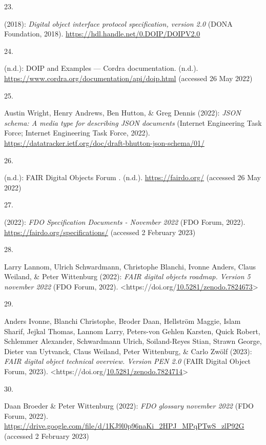 \begin{thebibliography}{9}
\hypertarget{ref-foundationDigitalObjectInterface}{}
23.

(2018): \emph{Digital object interface protocol specification, version
2.0} ({DONA Foundation}, 2018).
\url{https://hdl.handle.net/0.DOIP/DOIPV2.0}

\hypertarget{ref-DOIPExamplesCordraa}{}
24.

(n.d.): {DOIP} and {Examples} --- {Cordra} documentation. (n.d.).
\url{https://www.cordra.org/documentation/api/doip.html} (accessed 26
May 2022)

\hypertarget{ref-Draftbhuttonjsonschema}{}
25.

Austin Wright, Henry Andrews, Ben Hutton, \& Greg Dennis (2022):
\emph{JSON schema: A media type for describing JSON documents} (Internet
Engineering Task Force; Internet Engineering Task Force, 2022).
\url{https://datatracker.ietf.org/doc/draft-bhutton-json-schema/01/}

\hypertarget{ref-FAIRDigitalObjects}{}
26.

(n.d.): {FAIR Digital Objects Forum} \textbar. (n.d.).
\url{https://fairdo.org/} (accessed 26 May 2022)

\hypertarget{ref-fdo-Specs}{}
27.

(2022): \emph{{FDO Specification Documents - November 2022}} ({FDO
Forum}, 2022). \url{https://fairdo.org/specifications/} (accessed 2
February 2023)

\hypertarget{ref-fdo-Roadmap}{}
28.

Larry Lannom, Ulrich Schwardmann, Christophe Blanchi, Ivonne Anders,
Claus Weiland, \& Peter Wittenburg (2022): \emph{FAIR digital objects
roadmap. Version 5 november 2022} ({FDO Forum}, 2022).
\textless https://doi.org/\href{https://doi.org/10.5281/zenodo.7824673}{10.5281/zenodo.7824673}\textgreater{}

\hypertarget{ref-fdo-Overview}{}
29.

Anders Ivonne, Blanchi Christophe, Broder Daan, Hellström Maggie, Islam
Sharif, Jejkal Thomas, Lannom Larry, Peters-von Gehlen Karsten, Quick
Robert, Schlemmer Alexander, Schwardmann Ulrich, Soiland-Reyes Stian,
Strawn George, Dieter van Uytvanck, Claus Weiland, Peter Wittenburg, \&
Carlo Zwölf (2023): \emph{{FAIR} digital object technical overview.
Version PEN 2.0} ({FAIR Digital Object Forum}, 2023).
\textless https://doi.org/\href{https://doi.org/10.5281/zenodo.7824714}{10.5281/zenodo.7824714}\textgreater{}

\hypertarget{ref-fdo-Glossary}{}
30.

Daan Broeder \& Peter Wittenburg (2022): \emph{{FDO} glossary november
2022} ({FDO Forum}, 2022).
\url{https://drive.google.com/file/d/1KJ9l0p96naKi_2HPJ_MPqPTwS_zlP92G}
(accessed 2 February 2023)


\end{thebibliography}
